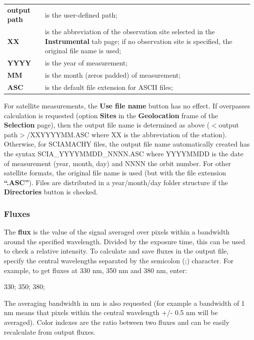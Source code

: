 \begin{longtable}[h]{l p{8cm}}
\textbf{output path} & is the user-defined path; \\ [6pt]
\textbf{XX} & is the abbreviation of the observation site selected in the \textbf{Instrumental} tab page; if no observation site is specified, the original file name is used; \\ [6pt]
\textbf{YYYY} & is the year of measurement; \\ [6pt]
\textbf{MM} & is the month (zeros padded) of measurement; \\ [6pt]
\textbf{ASC} & is the default file extension for ASCII files;	\\ [6pt]
\end{longtable}

For satellite measurements, the \textbf{Use file name} button has no effect. If overpasses calculation is requested (option \textbf{Sites} in the \textbf{Geolocation} frame of the \textbf{Selection} page), then the output file name is determined as above ($<$output path$>$/XXYYYYMM.ASC where XX is the abbreviation of the station). Otherwise, for SCIAMACHY files, the output file name automatically created has the syntax SCIA\_YYYYMMDD\_NNNN.ASC where YYYYMMDD is the date of measurement (year, month, day) and NNNN the orbit number. For other satellite formats, the original file name is used (but with the file extension \textbf{``.ASC''}). Files are distributed in a year/month/day folder structure if the \textbf{Directories} button is checked.

\subsubsection{Fluxes}
The \textbf{flux} is the value of the signal averaged over pixels within a bandwidth around the specified wavelength.  Divided by the exposure time, this can be used to check a relative intensity.  To calculate and save fluxes in the output file, specify the central wavelengths separated by the semicolon (;) character. For example, to get fluxes at 330 nm, 350 nm and 380 nm, enter:
\begin{center}
330; 350; 380;
\end{center}
The averaging bandwidth in nm is also requested (for example a bandwidth of 1 nm means that pixels within the central wavelength +/- 0.5 nm will be averaged).
Color indexes are the ratio between two fluxes and can be easily recalculate from output fluxes.

